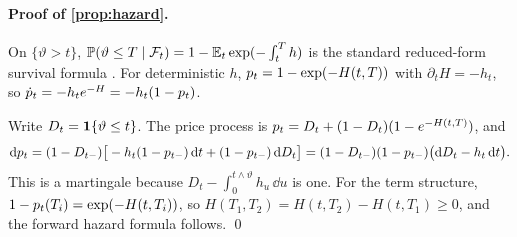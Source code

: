 \paragraph{Proof of \cref{prop:hazard}.}
On $\{\vartheta>t\}$, $\mathbb{P}(\vartheta\le T\mid\mathcal{F}_t)=1-\mathbb{E}_t\exp(-\int_t^T h)$ is the standard
reduced-form survival formula \citep{lando1998}. For deterministic $h$,
$p_t=1-\exp(-H(t,T))$ with $\partial_tH=-h_t$, so $\dot{p}_t=-h_t e^{-H}=-h_t(1-p_t)$.

Write $D_t=\mathbf{1}\{\vartheta\le t\}$. The price process is $p_t=D_t+(1-D_t)(1-e^{-H(t,T)})$, and
\[
  \mathrm{d}p_t=(1-D_{t-})\big[-h_t(1-p_{t-})\,\mathrm{d} t+(1-p_{t-})\,\mathrm{d} D_t\big]
  =(1-D_{t-})(1-p_{t-})\big(\mathrm{d} D_t-h_t\,\mathrm{d} t\big).
\]
This is a martingale because $D_t-\int_0^{t\wedge\vartheta}h_u\,\dd u$ is one. For the term
structure, $1-p_t(T_i)=\exp(-H(t,T_i))$, so $H(T_1,T_2)=H(t,T_2)-H(t,T_1)\ge0$, and the forward
hazard formula follows. \qed
